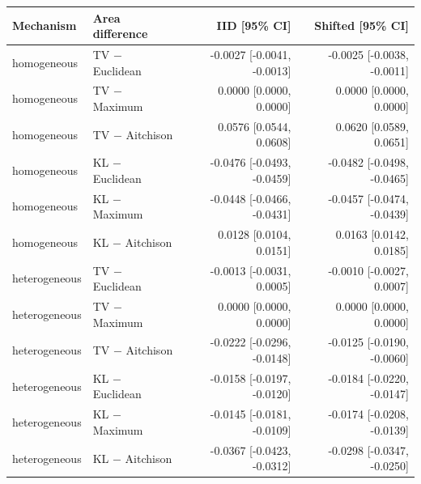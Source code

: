 \begin{tabular}{llrr}
\toprule
Mechanism & Area difference & IID [95\% CI] & Shifted [95\% CI] \\
\midrule
homogeneous & TV $-$ Euclidean & -0.0027 [-0.0041, -0.0013] & -0.0025 [-0.0038, -0.0011] \\
homogeneous & TV $-$ Maximum & 0.0000 [0.0000, 0.0000] & 0.0000 [0.0000, 0.0000] \\
homogeneous & TV $-$ Aitchison & 0.0576 [0.0544, 0.0608] & 0.0620 [0.0589, 0.0651] \\
homogeneous & KL $-$ Euclidean & -0.0476 [-0.0493, -0.0459] & -0.0482 [-0.0498, -0.0465] \\
homogeneous & KL $-$ Maximum & -0.0448 [-0.0466, -0.0431] & -0.0457 [-0.0474, -0.0439] \\
homogeneous & KL $-$ Aitchison & 0.0128 [0.0104, 0.0151] & 0.0163 [0.0142, 0.0185] \\
heterogeneous & TV $-$ Euclidean & -0.0013 [-0.0031, 0.0005] & -0.0010 [-0.0027, 0.0007] \\
heterogeneous & TV $-$ Maximum & 0.0000 [0.0000, 0.0000] & 0.0000 [0.0000, 0.0000] \\
heterogeneous & TV $-$ Aitchison & -0.0222 [-0.0296, -0.0148] & -0.0125 [-0.0190, -0.0060] \\
heterogeneous & KL $-$ Euclidean & -0.0158 [-0.0197, -0.0120] & -0.0184 [-0.0220, -0.0147] \\
heterogeneous & KL $-$ Maximum & -0.0145 [-0.0181, -0.0109] & -0.0174 [-0.0208, -0.0139] \\
heterogeneous & KL $-$ Aitchison & -0.0367 [-0.0423, -0.0312] & -0.0298 [-0.0347, -0.0250] \\
\bottomrule
\end{tabular}
